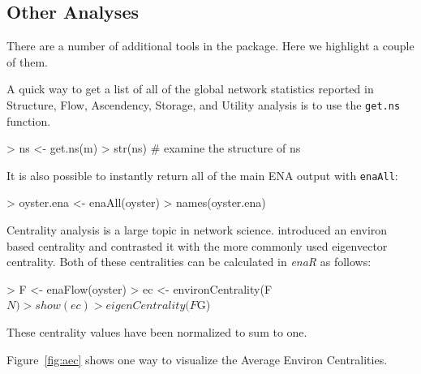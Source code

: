 \documentclass[article]{jss}
\begin{document}

\subsection{Other Analyses}
There are a number of additional tools in the package.  Here we
highlight a couple of them.

A quick way to get a list of all of the global network statistics reported in
Structure, Flow, Ascendency, Storage, and Utility analysis is to use the
\texttt{get.ns} function.

\begin{Schunk}
\begin{Sinput}
> ns <- get.ns(m)
> str(ns)    # examine the structure of ns
\end{Sinput}
\end{Schunk}

It is also possible to instantly return all of the main ENA output
with \texttt{enaAll}:

\begin{Schunk}
\begin{Sinput}
> oyster.ena <- enaAll(oyster)
> names(oyster.ena)
\end{Sinput}
\end{Schunk}

Centrality analysis is a large topic in network science.
\citet{fann12_ec} introduced an environ based centrality and contrasted
it with the more commonly used eigenvector centrality.  Both of these
centralities can be calculated in \textit{enaR} as follows:

\begin{Schunk}
\begin{Sinput}
> F <- enaFlow(oyster)
> ec <- environCentrality(F$N)
> show(ec)
> eigenCentrality(F$G)
\end{Sinput}
\end{Schunk}

These centrality values have been normalized to sum to one.

Figure~\ref{fig:aec} shows one way to visualize the Average Environ
Centralities.


\begin{Schunk}
\end{Schunk}
\end{document}
